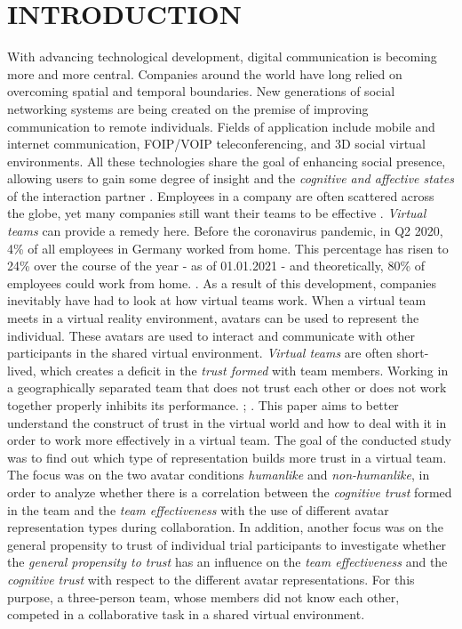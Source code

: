 \documentclass[sigchi]{acmart}
\begin{document}
\maketitle

\section{INTRODUCTION}
With advancing technological development, digital communication is becoming more and more central. Companies around the world have long relied on overcoming spatial and temporal boundaries.
New generations of social networking systems are being created on the premise of improving communication to remote individuals.
Fields of application include mobile and internet communication, FOIP/VOIP teleconferencing, and 3D social virtual environments.
All these technologies share the goal of enhancing social presence, allowing users to gain some degree of insight and the \textit{cognitive and affective states} of the interaction partner \citep{biocca2002defining}.
Employees in a company are often scattered across the globe, yet many companies still want their teams to be effective \citep{jarvenpaa1999communication}. \textit{Virtual teams} can provide a remedy here. 
Before the coronavirus pandemic, in Q2 2020, 4\% of all employees in Germany worked from home. This percentage has risen to 24\% over the course of the year - as of 01.01.2021 - and theoretically, 80\% of employees could work from home. \citep{statistaCorona2020}. As a result of this development, companies inevitably have had to look at how virtual teams work.
When a virtual team meets in a virtual reality environment, avatars can be used to represent the individual. These avatars are used to interact and communicate with other participants in the shared virtual environment.
\textit{Virtual teams} are often short-lived, which creates a deficit in the \textit{trust formed} with team members.
Working in a geographically separated team that does not trust each other or does not work together properly inhibits its performance. \citep{huang1998supporting}; \citep{turoff1993distributed}. This paper aims to better understand the construct of trust in the virtual world and how to deal with it in order to work more effectively in a virtual team.
The goal of the conducted study was to find out which type of representation builds more trust in a virtual team. The focus was on the two avatar conditions \textit{humanlike} and \textit{non-humanlike}, in order to analyze whether there is a correlation between the \textit{cognitive trust} formed in the team and the \textit{team effectiveness} with the use of different avatar representation types during collaboration.
In addition, another focus was on the general propensity to trust of individual trial participants to investigate whether the \textit{general propensity to trust} has an influence on the \textit{team effectiveness} and the \textit{cognitive trust} with respect to the different avatar representations. For this purpose, a three-person team, whose members did not know each other, competed in a collaborative task in a shared virtual environment.
\end{document}
